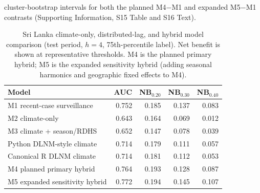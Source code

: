 \documentclass[11pt,a4paper]{article}
\begin{document}
cluster-bootstrap intervals for both the planned M4$-$M1 and expanded M5$-$M1 contrasts (Supporting Information, S15 Table and S16 Text).

\begin{table}[htbp]
\centering
\caption{Sri Lanka climate-only, distributed-lag, and hybrid model comparison (test period, $h=4$, 75th-percentile label). Net benefit is shown at representative thresholds. M4 is the planned primary hybrid; M5 is the expanded sensitivity hybrid (adding seasonal harmonics and geographic fixed effects to M4).}
\label{tab:dlnmhybrid}
\small
\begin{tabular}{lrrrr}
\toprule
Model & AUC & NB$_{0.20}$ & NB$_{0.30}$ & NB$_{0.40}$ \\
\midrule
M1 recent-case surveillance & 0.752 & 0.185 & 0.137 & 0.083 \\
M2 climate-only & 0.643 & 0.164 & 0.069 & 0.012 \\
M3 climate + season/RDHS & 0.652 & 0.147 & 0.078 & 0.039 \\
Python DLNM-style climate & 0.714 & 0.179 & 0.111 & 0.057 \\
Canonical R DLNM climate & 0.714 & 0.181 & 0.112 & 0.053 \\
M4 planned primary hybrid & 0.764 & 0.193 & 0.128 & 0.087 \\
M5 expanded sensitivity hybrid & 0.772 & 0.194 & 0.145 & 0.107 \\
\bottomrule
\end{tabular}
\end{table}
\end{document}
